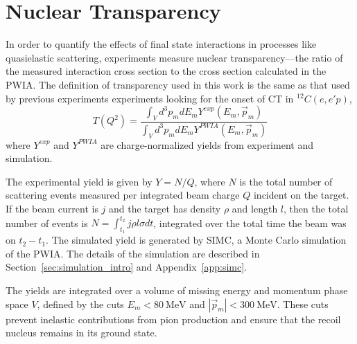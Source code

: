 \section{Nuclear Transparency}
In order to quantify the effects of final state interactions in processes
like quasielastic scattering, experiments measure nuclear transparency---the
ratio of
the measured interaction cross section
to
the cross section calculated in the PWIA.
The definition of transparency used in this work is the same as that used by
previous experiments experiments looking for the onset of CT in
${}^{12}C(e,e'p)$,
\begin{equation} \label{eqn:transparency_definition}
    T(Q^2) = \frac{\int_{V} d^{3} p_{m} d E_{m} Y^{exp }(E_{m}, \vec{p}_{m})}
                  {\int_{V} d^{3} p_{m} d E_{m} Y^{PWIA}(E_{m}, \vec{p}_{m})}
\end{equation}
where $Y^{exp}$ and $Y^{PWIA}$ are charge-normalized yields from experiment and
simulation.

The experimental yield is given by $Y=N/Q$, where $N$ is the total number of
scattering events measured per integrated beam charge $Q$ incident on the
target.
If the beam current is $j$ and the target has density $\rho$ and length $l$,
then the total number of events is $N=\int_{t_1}^{t_2} j \rho l \sigma dt$,
integrated over the total time the beam was on $t_2-t_1$.
The simulated yield is generated by SIMC, a Monte Carlo simulation of the PWIA.
The details of the simulation are described in
Section~\ref{sec:simulation_intro} and Appendix~\ref{app:simc}.

The yields are integrated over a volume of missing energy and momentum phase
space $V$, defined by the cuts $E_m < \SI{80}{\mega\electronvolt}$ and
$|\vec{p}_m| < \SI{300}{\mega\electronvolt}$.
These cuts prevent inelastic contributions from pion production and ensure that
the recoil nucleus remains in its ground state.
